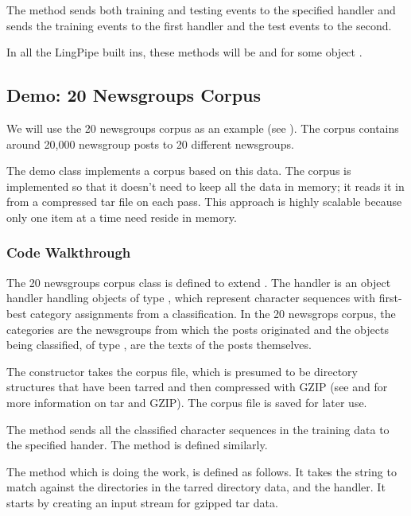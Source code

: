 The method  sends both training and testing
events to the specified handler and  sends the
training events to the first handler and the test events to the
second.

In all the LingPipe built ins, these methods will be
 and
 for some object .

\subsection{Demo: 20 Newsgroups Corpus}

We will use the 20 newsgroups corpus as an example (see
).  The corpus contains around 20,000
newsgroup posts to 20 different newsgroups.

The demo class  implements a corpus based
on this data.  The corpus is implemented so that it doesn't need to
keep all the data in memory; it reads it in from a compressed tar file
on each pass.  This approach is highly scalable because only one item
at a time need reside in memory.

\subsubsection{Code Walkthrough}

The 20 newsgroups corpus class is defined to extend .
%
%
The handler is an object handler handling objects of type
, which represent character sequences
with first-best category assignments from a classification.
In the 20 newsgrops corpus, the categories are the newsgroups from
which the posts originated and the objects being classified,
of type , are the texts of the posts themselves.

The constructor takes the corpus file, which is presumed to be
directory structures that have been tarred and then compressed with
GZIP (see  and  for more information on
tar and GZIP).  The corpus file is saved for later use.  

The  method sends all the classified character
sequences in the training data to the specified hander.
%
%
The  method is defined similarly.  

The  method which is doing the work, is
defined as follows.
%
%
It takes the string to match against the directories in the tarred
directory data, and the handler.  It starts by creating an input
stream for gzipped tar data.  

